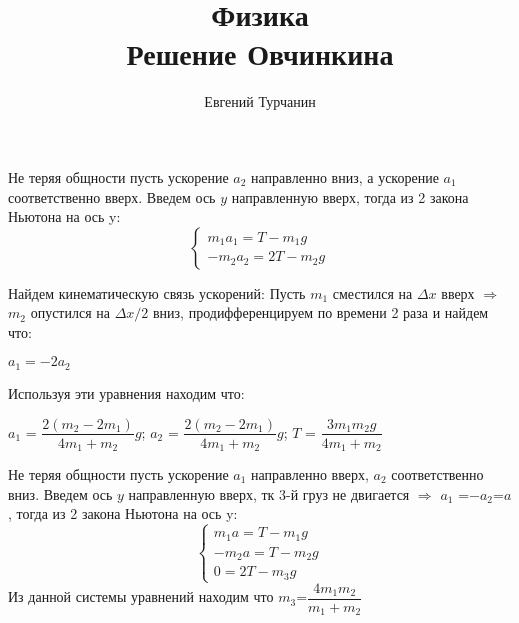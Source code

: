 \documentclass{report}
\title{\Huge{Физика}\\ Решение Овчинкина}
\author{\huge{Евгений Турчанин}}
\date{}
\begin{document}
\maketitle
{}
\sol Не теряя общности пусть ускорение $a_2$ направленно вниз, а ускорение $a_1$ соответственно вверх. Введем ось $y$ направленную вверх, тогда из 2 закона Ньютона на ось y:
\begin{equation}
\begin{cases}
	m_1 a_1=T-m_1g\\
	-m_2 a_2=2T-m_2g
\end{cases}
\end{equation}

Найдем кинематическую связь ускорений: Пусть $m_1$ сместился на $\Delta x$ вверх $\Rightarrow$ $m_2$ опустился на $\Delta x/2$ вниз, продифференцируем по времени 2 раза и найдем что:
\begin{center}
$a_1=-2a_2$
\end{center}

Используя эти уравнения находим что:
\begin{center}
$a_1$ = $\dfrac{2(m_2-2m_1)}{4m_1+m_2}g$; $a_2$ = $\dfrac{2(m_2-2m_1)}{4m_1+m_2}g$; $T$ = $\dfrac{3m_1m_2g}{4m_1+m_2}$
\end{center}




\sol Не теряя общности пусть ускорение $a_1$ направленно вверх, $a_2$ соответственно вниз. Введем ось $y$ направленную вверх, тк 3-й груз не двигается $\Rightarrow$ $a_1$ =$-a_2$=$a$, тогда из 2 закона Ньютона на ось y:
\begin{equation}
\begin{cases}
	m_1 a=T-m_1g\\
	-m_2 a=T-m_2g\\
	0=2T-m_3g
\end{cases}
\end{equation}
Из данной системы уравнений находим что $m_3$=$\dfrac{4m_1m_2}{m_1+m_2}$
\end{document}
